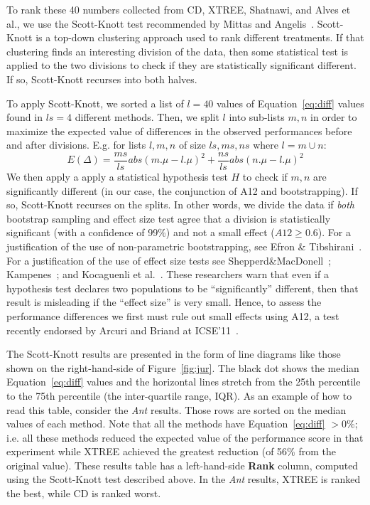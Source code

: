 \documentclass{sig-alternate}
\newcommand{\fig}[1]{Figure~\ref{fig:#1}}
\newcommand{\eq}[1]{Equation~\ref{eq:#1}}
\theoremstyle{break}
\begin{document}
\begin{itemize}


To rank these 40 numbers collected from CD, XTREE, Shatnawi, and Alves et al., we use the Scott-Knott test recommended by Mittas and Angelis~\cite{mittas13}. 
Scott-Knott is a top-down clustering approach used to rank different
treatments. If that clustering finds an interesting division of the data, then
some statistical test is applied to the two divisions to check if they
are statistically significant different. If so, Scott-Knott recurses
into both halves.

To  apply Scott-Knott,
  we
sorted a list of  $l=40$ values of \eq{diff} values found in  $ls=4$ different methods. 
Then, we split $l$ into sub-lists $m,n$ in order to maximize the expected value of differences in the observed performances before and after divisions. E.g. for lists $l,m,n$ of size $ls,ms,ns$ where $l=m\cup n$: \[E(\Delta)=\frac{ms}{ls}abs(m.\mu - l.\mu)^2 + \frac{ns}{ls}abs(n.\mu - l.\mu)^2\]
We then apply a apply a statistical hypothesis test $H$ to check
if $m,n$ are significantly different  (in our case, the conjunction of A12 and bootstrapping). If so, Scott-Knott recurses on the splits. In other words, we divide the data if \textit{both} bootstrap sampling and effect size test agree that a division is statistically significant (with a confidence of 99\%) and not a small effect ($A12 \ge 0.6$).
For a justification of the use of non-parametric bootstrapping, see Efron \& Tibshirani~\cite[p220-223]{efron93}. For a justification of the use of effect size tests see Shepperd\&MacDonell~\cite{shepperd12a}; Kampenes~\cite{kampenes07}; and Kocaguenli et al.~\cite{Kocaguneli2013:ep}. These researchers warn that even if a hypothesis test declares two populations to be ``significantly'' different, then that result is misleading if the ``effect size'' is very small. Hence, to assess the performance differences we first must rule out small effects using A12, a test   recently endorsed by Arcuri and Briand at ICSE'11~\cite{arcuri11}.

The Scott-Knott  results are presented in the form of line diagrams like those shown on the right-hand-side of \fig{jur}.
The black dot shows the median \eq{diff} values and the horizontal lines stretch 
from the 25th percentile to the 75th percentile (the inter-quartile range, IQR).
As an example of how to read this table, consider the {\em Ant}
results. Those rows are  sorted on the median values of each method. Note that all the methods have \eq{diff} $\gt 0\%$; i.e. all these methods reduced the expected value of the performance score in that experiment while XTREE achieved the greatest reduction (of 56\% from the original value).
These results table has a  left-hand-side  {\bf Rank} column, computed using the
Scott-Knott test described above. In the {\em Ant}
results, XTREE is ranked the best, while CD is  ranked   worst.


\end{itemize}
\end{document}

